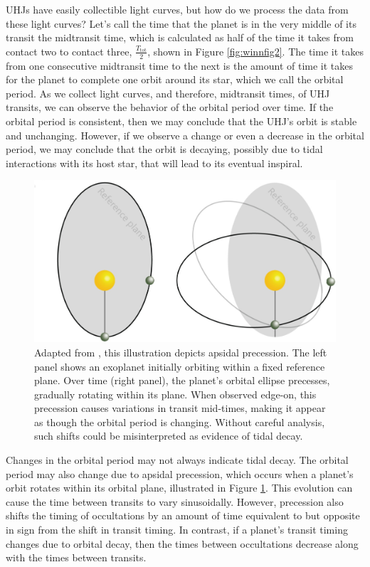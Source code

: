 \documentclass[oneside,12pt]{amsart}
\numberwithin{page}{section}
\begin{document}
UHJs have easily collectible light curves, but how do we process the data from these light curves? Let's call the time that the planet is in the very middle of its transit the midtransit time, which is calculated as half of the time it takes from contact two to contact three, $\frac{T_{\text{tot}}}{2}$, shown in Figure \ref{fig:winnfig2}. The time it takes from one consecutive midtransit time to the next is the amount of time it takes for the planet to complete one orbit around its star, which we call the orbital period. As we collect light curves, and therefore, midtransit times, of UHJ transits, we can observe the behavior of the orbital period over time. If the orbital period is consistent, then we may conclude that the UHJ's orbit is stable and unchanging. However, if we observe a change or even a decrease in the orbital period, we may conclude that the orbit is decaying, possibly due to tidal interactions with its host star, that will lead to its eventual inspiral. 

\begin{figure}[htbp]
    \centering
    \includegraphics[width=0.8\linewidth]{figs/precession.jpg}
    \caption{Adapted from \citet{vervoort2022system}, this illustration depicts apsidal precession. The left panel shows an exoplanet initially orbiting within a fixed reference plane. Over time (right panel), the planet’s orbital ellipse precesses, gradually rotating within its plane. When observed edge-on, this precession causes variations in transit mid-times, making it appear as though the orbital period is changing. Without careful analysis, such shifts could be misinterpreted as evidence of tidal decay.}
    \label{fig:precession}
\end{figure}

Changes in the orbital period may not always indicate tidal decay. The orbital period may also change due to apsidal precession, which occurs when a planet's orbit rotates within its orbital plane, illustrated in Figure \ref{fig:precession}. This evolution can cause the time between transits to vary sinusoidally. However, precession also shifts the timing of occultations by an amount of time equivalent to but opposite in sign from the shift in transit timing. In contrast, if a planet's transit timing changes due to orbital decay, then the times between occultations decrease along with the times between transits.
\end{document}
